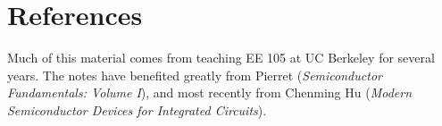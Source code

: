 \section{References}
Much of this material comes from teaching EE 105 at UC Berkeley for several years.  The notes have benefited greatly from Pierret\cite{pierret} (\emph{Semiconductor Fundamentals: Volume I}), and most recently from Chenming Hu\cite{hu} (\emph{Modern Semiconductor Devices for Integrated Circuits}).
